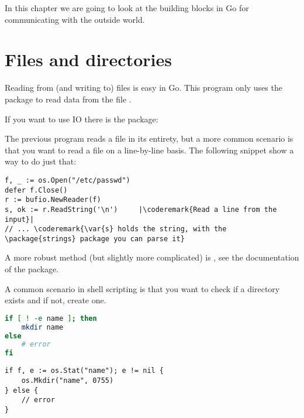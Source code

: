 \noindent{}In this chapter we are going to look at the building blocks in Go for 
communicating with the outside world.

\section{Files and directories}
Reading from (and writing to) files is easy in Go. This program
only uses the  package to read data from the file .

\showremarks
If you want to use  IO there is the
 package:

\showremarks

The previous program reads a file in its entirety, but a more common scenario is that
you want to read a file on a line-by-line basis. The following snippet show a way
to do just that:

\begin{lstlisting}
f, _ := os.Open("/etc/passwd")
defer f.Close()
r := bufio.NewReader(f)
s, ok := r.ReadString('\n')     |\coderemark{Read a line from the input}|
// ... \coderemark{\var{s} holds the string, with the \package{strings} package you can parse it}
\end{lstlisting}

A more robust method (but slightly more complicated) is , see the documentation
of the  package.

A common scenario in shell scripting is that you want to check if a directory
exists and if not, create one. 

\begin{minipage}{.5\textwidth}
\begin{lstlisting}[language=sh,caption={Create a directory in the shell}]
if [ ! -e name ]; then
    mkdir name
else
    # error
fi
\end{lstlisting}
\end{minipage}
\hspace{1em}
\begin{minipage}{.5\textwidth}
\begin{lstlisting}[caption={Create a directory with Go}]
if f, e := os.Stat("name"); e != nil {
    os.Mkdir("name", 0755)
} else {
    // error
}
\end{lstlisting}
\end{minipage}

